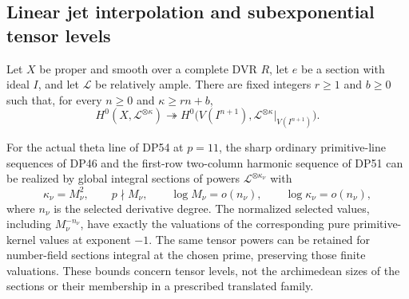 \subsection{Linear jet interpolation and subexponential tensor levels}

\begin{theorem}\label{DP56}
Let $X$ be proper and smooth over a complete DVR $R$, let $e$ be a section with ideal $I$, and let $\mathcal L$ be relatively ample.
There are fixed integers $r\ge1$ and $b\ge0$ such that, for every $n\ge0$ and $\kappa\ge rn+b$,
\begin{equation}\label{eq:linearjetthreshold}
 H^0(X,\mathcal L^{\otimes\kappa})
 \twoheadrightarrow
 H^0\bigl(V(I^{n+1}),\mathcal L^{\otimes\kappa}|_{V(I^{n+1})}\bigr).
\end{equation}

For the actual theta line of DP54 at $p=11$, the sharp ordinary primitive-line sequences of DP46 and the first-row two-column harmonic sequence of DP51 can be realized by global integral sections of powers $\mathcal L^{\otimes\kappa_\nu}$ with
\[
 \kappa_\nu=M_\nu^2,\qquad p\nmid M_\nu,
 \qquad \log M_\nu=o(n_\nu),
 \qquad \log\kappa_\nu=o(n_\nu),
\]
where $n_\nu$ is the selected derivative degree.
The normalized selected values, including $M_\nu^{-n_\nu}$, have exactly the valuations of the corresponding pure primitive-kernel values at exponent $-1$.
The same tensor powers can be retained for number-field sections integral at the chosen prime, preserving those finite valuations.
These bounds concern tensor levels, not the archimedean sizes of the sections or their membership in a prescribed translated family.
\end{theorem}

